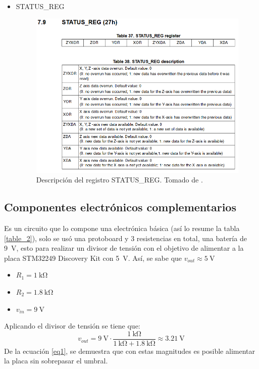 \begin{itemize}
    \item STATUS\_REG
    \begin{figure}[H]
        \centering
        \includegraphics[width=.7\linewidth]{Imagenes/k3.png}
        \caption{Descripción del registro STATUS\_REG. Tomado de \cite{l3gd20}.}
        \label{fig7}
    \end{figure}
\end{itemize}

\subsection*{Componentes electrónicos complementarios}
Es un circuito que lo compone una electrónica básica (así lo resume la tabla \ref{table_2}), solo se usó una protoboard y 3 resistencias en total, una batería de \SI{9}{\volt}, esto para realizar un divisor de tensión con el objetivo de alimentar a la placa STM32249 Discovery Kit con \SI{5}{\volt}. Así, se sabe que $v_{out} \approx \SI{5}{\volt}$
\begin{itemize}
\item $R_1 = \SI{1}{\kilo\ohm}$
\item $R_2 = \SI{1.8}{\kilo\ohm}$
\item $v_{in} =  \SI{9}{\volt}$
\end{itemize}
Aplicando el divisor de tensión se tiene que:
\begin{equation}
v_{out} = \SI{9}{\volt} \cdot \frac{  \SI{1}{\kilo\ohm} }{ \SI{1}{\kilo\ohm}+\SI{1.8}{\kilo\ohm}} \approx \SI{3.21}{\volt}
\label{eq1}
\end{equation}
De la ecuación \ref{eq1}, se demuestra que con estas magnitudes es posible alimentar la placa sin sobrepasar el umbral.

